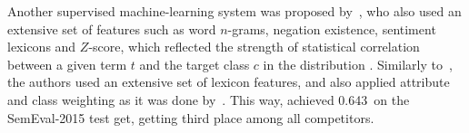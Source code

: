 
Another supervised machine-learning system was proposed
by~\citet{Hamdan:15}, who also used an extensive set of features such
as word $n$-grams, negation existence, sentiment lexicons and
$Z$-score, which reflected the strength of statistical correlation
between a given term $t$ and the target class $c$ in the distribution
\cite[cf.][]{Hamdan:14}.  Similarly to~\citet{Mohammad:13}, the
authors used an extensive set of lexicon features, and also applied
attribute and class weighting as it was done by~\citet{Guenther:14}.
This way, \citeauthor{Hamdan:15} achieved 0.643~\F on the SemEval-2015
test get, getting third place among all competitors.




